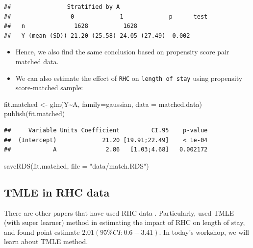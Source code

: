 \documentclass[
]{book}
\newenvironment{Shaded}{\begin{snugshade}}{\end{snugshade}}
\newcommand{\AttributeTok}[1]{\textcolor[rgb]{0.77,0.63,0.00}{#1}}
\newcommand{\FunctionTok}[1]{\textcolor[rgb]{0.00,0.00,0.00}{#1}}
\newcommand{\NormalTok}[1]{#1}
\newcommand{\OtherTok}[1]{\textcolor[rgb]{0.56,0.35,0.01}{#1}}
\newcommand{\SpecialCharTok}[1]{\textcolor[rgb]{0.00,0.00,0.00}{#1}}
\newcommand{\StringTok}[1]{\textcolor[rgb]{0.31,0.60,0.02}{#1}}
\providecommand{\tightlist}{%
  \setlength{\itemsep}{0pt}\setlength{\parskip}{0pt}}
\begin{document}
\begin{verbatim}
##                Stratified by A
##                 0             1             p      test
##   n              1628          1628                    
##   Y (mean (SD)) 21.20 (25.58) 24.05 (27.49)  0.002
\end{verbatim}

\begin{itemize}
\tightlist
\item
  Hence, we also find the same conclusion based on propensity score pair matched data.
\item
  We can also estimate the effect of \texttt{RHC} on \texttt{length\ of\ stay} using propensity score-matched sample:
\end{itemize}

\begin{Shaded}
\begin{Highlighting}[]
\NormalTok{fit.matched }\OtherTok{\textless{}{-}} \FunctionTok{glm}\NormalTok{(Y}\SpecialCharTok{\textasciitilde{}}\NormalTok{A,}
            \AttributeTok{family=}\NormalTok{gaussian, }
            \AttributeTok{data =}\NormalTok{ matched.data)}
\FunctionTok{publish}\NormalTok{(fit.matched)}
\end{Highlighting}
\end{Shaded}

\begin{verbatim}
##     Variable Units Coefficient         CI.95    p-value 
##  (Intercept)             21.20 [19.91;22.49]    < 1e-04 
##            A              2.86   [1.03;4.68]   0.002172
\end{verbatim}

\begin{Shaded}
\begin{Highlighting}[]
\FunctionTok{saveRDS}\NormalTok{(fit.matched, }\AttributeTok{file =} \StringTok{"data/match.RDS"}\NormalTok{)}
\end{Highlighting}
\end{Shaded}

\hypertarget{tmle-in-rhc-data}{%
\subsection{TMLE in RHC data}\label{tmle-in-rhc-data}}

There are other papers that have used RHC data \citep{keele2021comparing, keele2018pre}. Particularly, \citet{keele2021comparing} used TMLE (with super learner) method in estimating the impact of RHC on length of stay, and found point estimate \(2.01 (95\% CI: 0.6-3.41)\). In today's workshop, we will learn about TMLE method.
\end{document}
